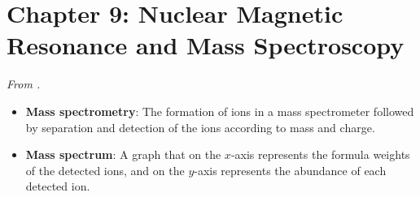 \documentclass[../notes.tex]{subfiles}
\begin{document}
\section{Chapter 9: Nuclear Magnetic Resonance and Mass Spectroscopy}
\emph{From \textcite{bib:SolomonsEtAl}.}
\begin{itemize}
    \item \textbf{Mass spectrometry}: The formation of ions in a mass spectrometer followed by separation and detection of the ions according to mass and charge.
    \item \textbf{Mass spectrum}: A graph that on the $x$-axis represents the formula weights of the detected ions, and on the $y$-axis represents the abundance of each detected ion.
    \begin{figure}[h!]
        \centering
\end{figure}
\end{itemize}
\end{document}
